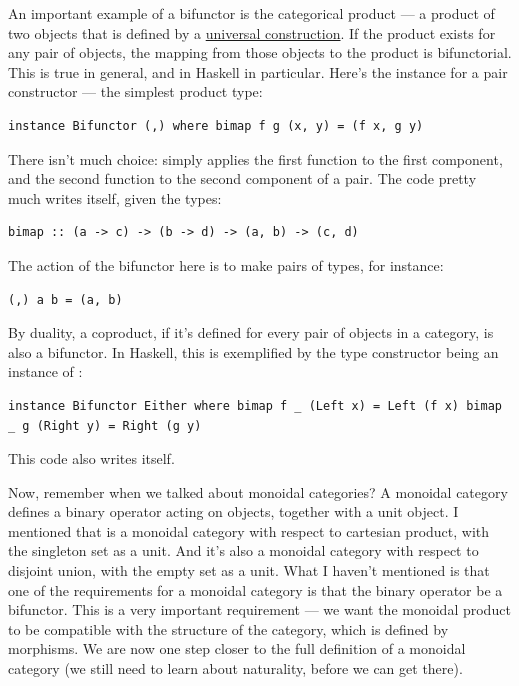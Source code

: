 An important example of a bifunctor is the categorical product --- a
product of two objects that is defined by a
\href{https://bartoszmilewski.com/2015/01/07/products-and-coproducts/}{universal
construction}. If the product exists for any pair of objects, the
mapping from those objects to the product is bifunctorial. This is true
in general, and in Haskell in particular. Here's the 
instance for a pair constructor --- the simplest product type:

\begin{verbatim}
instance Bifunctor (,) where bimap f g (x, y) = (f x, g y)
\end{verbatim}

There isn't much choice:  simply applies the first
function to the first component, and the second function to the second
component of a pair. The code pretty much writes itself, given the
types:

\begin{verbatim}
bimap :: (a -> c) -> (b -> d) -> (a, b) -> (c, d)
\end{verbatim}

The action of the bifunctor here is to make pairs of types, for
instance:

\begin{verbatim}
(,) a b = (a, b)
\end{verbatim}

By duality, a coproduct, if it's defined for every pair of objects in a
category, is also a bifunctor. In Haskell, this is exemplified by the
 type constructor being an instance of
:

\begin{verbatim}
instance Bifunctor Either where bimap f _ (Left x) = Left (f x) bimap _ g (Right y) = Right (g y)
\end{verbatim}

This code also writes itself.

Now, remember when we talked about monoidal categories? A monoidal
category defines a binary operator acting on objects, together with a
unit object. I mentioned that  is a monoidal category with
respect to cartesian product, with the singleton set as a unit. And it's
also a monoidal category with respect to disjoint union, with the empty
set as a unit. What I haven't mentioned is that one of the requirements
for a monoidal category is that the binary operator be a bifunctor. This
is a very important requirement --- we want the monoidal product to be
compatible with the structure of the category, which is defined by
morphisms. We are now one step closer to the full definition of a
monoidal category (we still need to learn about naturality, before we
can get there).

